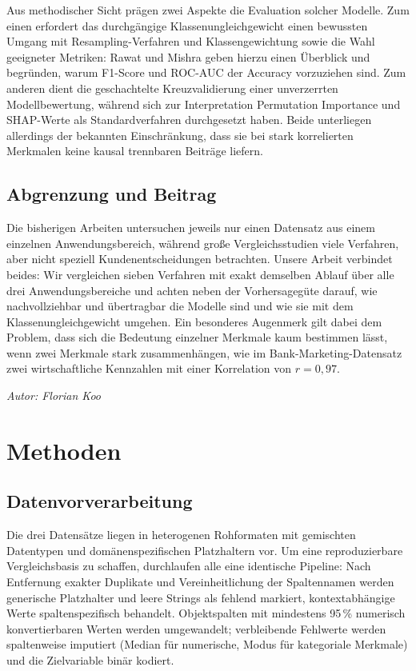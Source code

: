 \documentclass[10pt]{scrartcl}
\begin{document}
Aus methodischer Sicht prägen zwei Aspekte die Evaluation solcher Modelle. Zum einen erfordert
das durchgängige Klassenungleichgewicht einen bewussten Umgang mit Resampling-Verfahren und
Klassengewichtung sowie die Wahl geeigneter Metriken: Rawat und Mishra \cite{RawatMishra2022}
geben hierzu einen Überblick und begründen, warum F1-Score und ROC-AUC der Accuracy vorzuziehen
sind. Zum anderen dient die geschachtelte Kreuzvalidierung einer unverzerrten Modellbewertung,
während sich zur Interpretation Permutation Importance \cite{Breiman2001} und SHAP-Werte
\cite{Lundberg2017} als Standardverfahren durchgesetzt haben. Beide unterliegen allerdings der
bekannten Einschränkung, dass sie bei stark korrelierten Merkmalen keine kausal trennbaren
Beiträge liefern.

\subsection{Abgrenzung und Beitrag}
Die bisherigen Arbeiten untersuchen jeweils nur einen Datensatz aus einem einzelnen
Anwendungsbereich, während große Vergleichsstudien \cite{FernandezDelgado2014} viele Verfahren,
aber nicht speziell Kundenentscheidungen betrachten. Unsere Arbeit verbindet beides: Wir vergleichen
sieben Verfahren mit exakt demselben Ablauf über alle drei Anwendungsbereiche und achten neben der
Vorhersagegüte darauf, wie nachvollziehbar und übertragbar die Modelle sind und wie sie mit dem
Klassenungleichgewicht umgehen. Ein besonderes Augenmerk gilt dabei dem Problem, dass sich die
Bedeutung einzelner Merkmale kaum bestimmen lässt, wenn zwei Merkmale stark zusammenhängen, wie im
Bank-Marketing-Datensatz zwei wirtschaftliche Kennzahlen mit einer Korrelation von $r=0{,}97$.

\begin{flushright}\textit{Autor: Florian Koo}\end{flushright}

\section{Methoden}
\subsection{Datenvorverarbeitung}
\label{sec:preprocessing}

Die drei Datensätze liegen in heterogenen Rohformaten mit gemischten Datentypen und domänenspezifischen Platzhaltern vor. Um eine reproduzierbare Vergleichsbasis zu schaffen, durchlaufen alle eine identische Pipeline: Nach Entfernung exakter Duplikate und Vereinheitlichung der Spaltennamen werden generische Platzhalter und leere Strings als fehlend markiert, kontextabhängige Werte spaltenspezifisch behandelt. Objektspalten mit mindestens 95\,\% numerisch konvertierbaren Werten werden umgewandelt; verbleibende Fehlwerte werden spaltenweise imputiert (Median für numerische, Modus für kategoriale Merkmale) und die Zielvariable binär kodiert.
\end{document}
